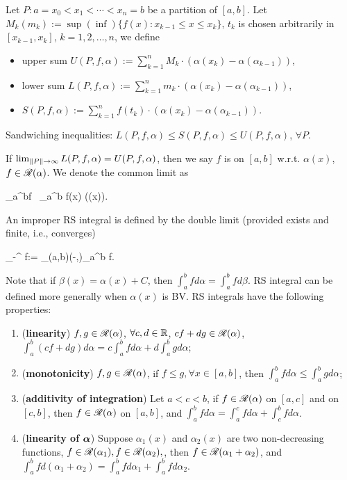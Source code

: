 \documentclass[10pt,a4paper]{article}
\begin{document}
Let $P:a=x_0<x_1<\cdots<x_n=b$ be a partition of $[a,b]$. Let $M_k (m_k):=\sup (\inf)\{f(x):x_{k-1}\leq x\leq x_k\}$, $t_k$ is chosen arbitrarily in $[x_{k-1},x_k]$, $k=1,2,\ldots, n$, we define
\begin{itemize}
	\item upper sum $U(P,f,\alpha):=\sum_{k=1}^{n} M_k \cdot (\alpha(x_k)-\alpha(\alpha_{k-1}))$,
	\item lower sum $L(P,f,\alpha):=\sum_{k=1}^{n} m_k \cdot (\alpha(x_k)-\alpha(\alpha_{k-1}))$,
	\item {} $S(P,f,\alpha):=\sum_{k=1}^{n} f(t_k) \cdot (\alpha(x_k)-\alpha(\alpha_{k-1}))$.
\end{itemize}
Sandwiching inequalities: $L(P,f,\alpha)\leq S(P,f,\alpha)\leq U(P,f,\alpha)$, $\forall P$. 
\begin{defbox}
	\begin{definition}\label{def:RSint}
		If $\lim_{\left\lVert P\right\rVert\to \infty }L(P,f,\alpha)=U(P,f,\alpha)$, then we say $f$ is  on $[a,b]$ w.r.t. $\alpha(x)$, $f\in\mathscr{R}(\alpha)$. We denote the common limit as 
		\begin{sequation*}
			\int_{a}^{b}f\rmd\alpha \  \int_{a}^{b} f(x) \rmd(\alpha(x)).
		\end{sequation*}
		An improper RS integral is defined by the double limit (provided exists and finite, i.e., converges)
		\begin{sequation*}
			\int_{-\infty }^{\infty } f\rmd \alpha := \lim_{(a,b)\to(-\infty ,\infty )}\int_{a}^{b} f\rmd \alpha.
		\end{sequation*}
	\end{definition}
\end{defbox}
Note that if $\beta(x)=\alpha(x)+C$, then $\int_{a}^{b}f d\alpha = \int_{a}^{b} f d\beta$. RS integral can be defined more generally when $\alpha(x)$ is BV. RS integrals have the following properties:
\begin{enumerate}
	\item (\textbf{linearity}) $f,g\in\mathscr{R}(\alpha)$,  $\forall c,d\in\mathbb R$, $cf+dg\in\mathscr{R}(\alpha)$, $\int_{a}^{b}(cf+dg)d\alpha=c\int_{a}^{b}fd\alpha + d\int_{a}^{b}gd\alpha$; 
	\item (\textbf{monotonicity}) $f,g\in\mathscr{R}(\alpha)$, if $f\leq g,\forall x\in[a,b]$, then $\int_{a}^{b}fd\alpha\leq\int_{a}^{b}gd\alpha$;
	\item (\textbf{additivity of integration}) Let $a<c<b$, if $f\in\mathscr{R}(\alpha)$ on $[a,c]$ and on $[c,b]$, then $f\in\mathscr{R}(\alpha)$ on $[a,b]$, and $\int_{a}^{b}fd\alpha=\int_{a}^{c}fd\alpha + \int_{c}^{b}fd\alpha$. 
	\item (\textbf{linearity of} ${\boldsymbol \alpha}$) Suppose $\alpha_1(x)$ and $\alpha_2(x)$ are two non-decreasing functions, $f\in\mathscr{R}(\alpha_1),f\in\mathscr{R}(\alpha_2),$, then $f\in\mathscr{R}(\alpha_1+\alpha_2)$, and $\int_{a}^{b}fd(\alpha_1+\alpha_2)=\int_{a}^{b}fd\alpha_1+\int_{a}^{b}fd\alpha_2$.       
\end{enumerate}
\end{document}
